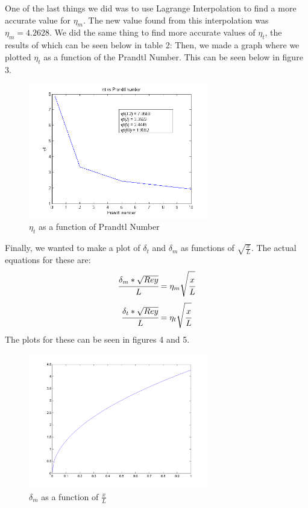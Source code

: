 \documentclass{article}
\def\beq{\begin{equation}}
\def\eeq{\end{equation}}
\begin{document}
One of the last things we did was to use Lagrange Interpolation to find a more accurate value for $\eta_m$. The new value found from this interpolation was $\eta_m=4.2628$. We did the same thing to find more accurate values of $\eta_t$, the results of which can be seen below in table 2:
Then, we made a graph where we plotted $\eta_t$ as a function of the Prandtl Number. This can be seen below in figure 3. %
\begin{figure}[H]
    \centering
    \includegraphics[width=0.7\textwidth]{etavPr.png}
    \caption{$\eta_t$ as a function of Prandtl Number}
\end{figure}
Finally, we wanted to make a plot of $\delta_t$ and $\delta_m$ as functions of $\sqrt{\frac{x}{L}}$. The actual equations for these are:
\beq \cfrac{\delta_m*\sqrt{Rey}}{L}=\eta_m\sqrt{\cfrac{x}{L}}\eeq
\beq \cfrac{\delta_t*\sqrt{Rey}}{L}=\eta_t\sqrt{\cfrac{x}{L}}\eeq
The plots for these can be seen in figures 4 and 5.
\begin{figure}[H]
    \centering
    \includegraphics[width=0.7\textwidth]{deltam.png}
    \caption{$\delta_m$ as a function of $\frac{x}{L}$}
\end{figure}
\end{document}
